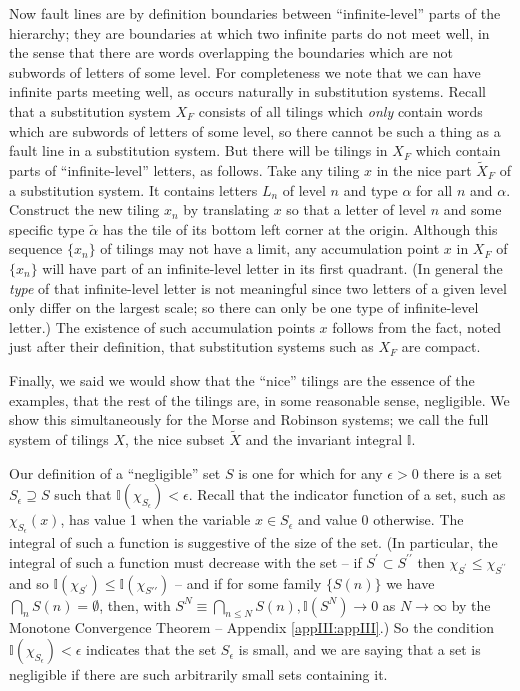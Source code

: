 \documentclass[reqno]{stml-l}
\theoremstyle{plain}
\theoremstyle{definition}
\numberwithin{equation}{chapter}
\begin{document}
Now fault lines are by definition boundaries between ``infinite-level'' parts of the hierarchy; they are boundaries at which two infinite parts do not meet well, in the sense that there are words overlapping the boundaries which are not subwords of letters of some level. For completeness we note that we can have infinite parts meeting well, as occurs naturally in substitution systems. Recall that a substitution system $X_{F}$ consists of all tilings which \emph{only} contain words which are
subwords of letters of some level, so there cannot be such a thing as a fault line in a substitution system. But there will be tilings in $X_{F}$ which contain parts of ``infinite-level'' letters, as follows. Take any tiling $x$ in the nice part $\tilde{X}_{F}$ of a substitution system. It contains letters $L_{n}$ of level $n$ and type $\alpha$ for all $n$ and $\alpha$. Construct the new tiling $x_{n}$ by translating $x$ so that a letter of level $n$ and some specific type $\tilde{\alpha}$ has the tile of its bottom left corner at the origin. Although this sequence $\{x_{n}\}$ of tilings may not have a limit, any accumulation point $x$ in $X_{F}$ of $\{x_{n}\}$ will have part of an infinite-level letter in its first quadrant. (In general the \emph{type} of that infinite-level letter is not meaningful since two letters of a given level only differ on the largest scale; so there can only be one type of infinite-level letter.) The existence of such accumulation points $x$ follows from the fact, noted just after their definition, that substitution systems such as $X_{F}$ are compact.

Finally, we said we would show that the ``nice'' tilings are the essence of the examples, that the rest of the tilings are, in some reasonable sense, negligible. We show this simultaneously for the Morse and Robinson systems; we call the full system of tilings $X$, the nice subset $\tilde{X}$ and the invariant integral $\mathbb{I}$.

Our definition of a ``negligible'' set $S$ is one for which for any $\epsilon>0$ there is a set $S_{\epsilon}\supseteq S$ such that $\mathbb{I}(\chi_{S_{\epsilon}})<\epsilon$. Recall that the indicator function of a set, such as $\chi_{S_{\epsilon}}(x)$, has value 1 when the variable $x\in S_{\epsilon}$ and value 0 otherwise. The integral of such a function is suggestive of the size of the set. (In particular, the integral of such a function must decrease with the set --
if $S^{\prime}\subset S^{\prime\prime}$ then $\chi_{S^{\prime}}\leq\chi_{S^{\prime\prime}}$ and so $\mathbb{I}(\chi_{S^{\prime}})\leq\mathbb{I}(\chi_{S{\prime\prime}})$ -- and if for some family $\{S(n)\}$ we have $\bigcap_{n}S(n)=\emptyset$, then, with $S^{N}\equiv\bigcap_{n\leq N}S(n),\mathbb{I}(S^{N})\rightarrow 0$ as $N\rightarrow\infty$ by the Monotone Convergence Theorem -- Appendix \ref{appIII:appIII}.) So the condition $\mathbb{I}(\chi_{S_{\epsilon}})<\epsilon$ indicates that
the set $S_{\epsilon}$ is small, and we are saying that a set is negligible if there are such arbitrarily small sets containing it.
\end{document}
